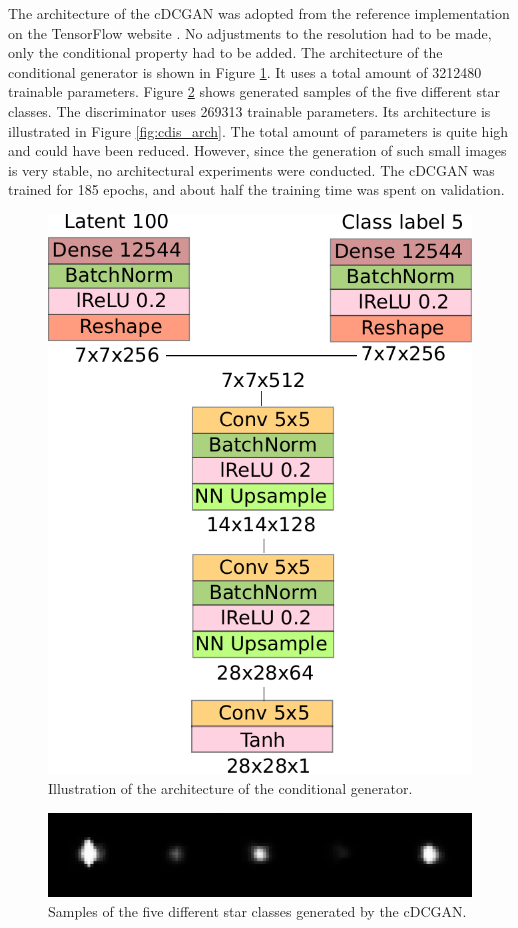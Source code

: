 \documentclass[10pt,conference,compsocconf]{IEEEtran}
\begin{document}
The architecture of the cDCGAN was adopted from the reference implementation on the TensorFlow website \cite{dcgantf}. No adjustments to the resolution had to be made, only the conditional property had to be added. The architecture of the conditional generator is shown in Figure \ref{fig:cgen_arch}. It uses a total amount of \SI{3212480}{} trainable parameters. Figure \ref{fig:clustered_generated_stars} shows generated samples of the five different star classes. The discriminator uses \SI{269313}{} trainable parameters. Its architecture is illustrated in Figure \ref{fig:cdis_arch}. The total amount of parameters is quite high and could have been reduced. However, since the generation of such small images is very stable, no architectural experiments were conducted. The cDCGAN was trained for 185 epochs, and about half the training time was spent on validation.

\begin{figure}
    \centering
    \includegraphics[width=0.58\columnwidth]{assets/cgen_arch.pdf}
    \caption{Illustration of the architecture of the conditional generator.}
    \label{fig:cgen_arch}
\end{figure}

\begin{figure}[hb]
    \centering
    \includegraphics[width=\columnwidth]{assets/clustered_generated_stars_resized.png}
    \caption{Samples of the five different star classes generated by the cDCGAN.}
    \label{fig:clustered_generated_stars}
\end{figure}
\end{document}
